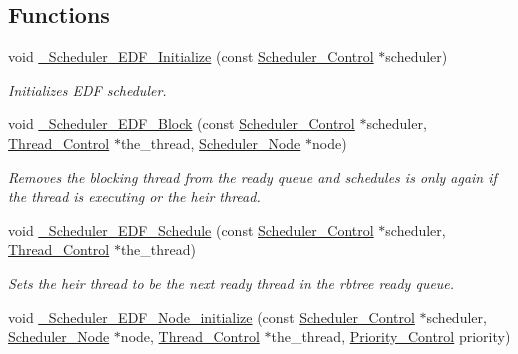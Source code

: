 \subsection*{Functions}
\begin{DoxyCompactItemize}
\item 
void \mbox{\hyperlink{group__RTEMSScoreSchedulerEDF_ga8648861ae22830f1cfcddf7132b6163a}{\+\_\+\+Scheduler\+\_\+\+E\+D\+F\+\_\+\+Initialize}} (const \mbox{\hyperlink{struct__Scheduler__Control}{Scheduler\+\_\+\+Control}} $\ast$scheduler)
\begin{DoxyCompactList}\small\item\em Initializes E\+DF scheduler. \end{DoxyCompactList}\item 
void \mbox{\hyperlink{group__RTEMSScoreSchedulerEDF_gac26bbc49f94fa506fd0bdea7c1f09066}{\+\_\+\+Scheduler\+\_\+\+E\+D\+F\+\_\+\+Block}} (const \mbox{\hyperlink{struct__Scheduler__Control}{Scheduler\+\_\+\+Control}} $\ast$scheduler, \mbox{\hyperlink{struct__Thread__Control}{Thread\+\_\+\+Control}} $\ast$the\+\_\+thread, \mbox{\hyperlink{structScheduler__Node}{Scheduler\+\_\+\+Node}} $\ast$node)
\begin{DoxyCompactList}\small\item\em Removes the blocking thread from the ready queue and schedules is only again if the thread is executing or the heir thread. \end{DoxyCompactList}\item 
void \mbox{\hyperlink{group__RTEMSScoreSchedulerEDF_gaffeb1173b847e46074a4f8b2e39e6b81}{\+\_\+\+Scheduler\+\_\+\+E\+D\+F\+\_\+\+Schedule}} (const \mbox{\hyperlink{struct__Scheduler__Control}{Scheduler\+\_\+\+Control}} $\ast$scheduler, \mbox{\hyperlink{struct__Thread__Control}{Thread\+\_\+\+Control}} $\ast$the\+\_\+thread)
\begin{DoxyCompactList}\small\item\em Sets the heir thread to be the next ready thread in the rbtree ready queue. \end{DoxyCompactList}\item 
void \mbox{\hyperlink{group__RTEMSScoreSchedulerEDF_ga465fd54ce1c8c0633424db0933856c67}{\+\_\+\+Scheduler\+\_\+\+E\+D\+F\+\_\+\+Node\+\_\+initialize}} (const \mbox{\hyperlink{struct__Scheduler__Control}{Scheduler\+\_\+\+Control}} $\ast$scheduler, \mbox{\hyperlink{structScheduler__Node}{Scheduler\+\_\+\+Node}} $\ast$node, \mbox{\hyperlink{struct__Thread__Control}{Thread\+\_\+\+Control}} $\ast$the\+\_\+thread, \mbox{\hyperlink{group__RTEMSScorePriority_ga59d02b58072d31a9a1cfe644557aefe2}{Priority\+\_\+\+Control}} priority)

\end{DoxyCompactItemize}
